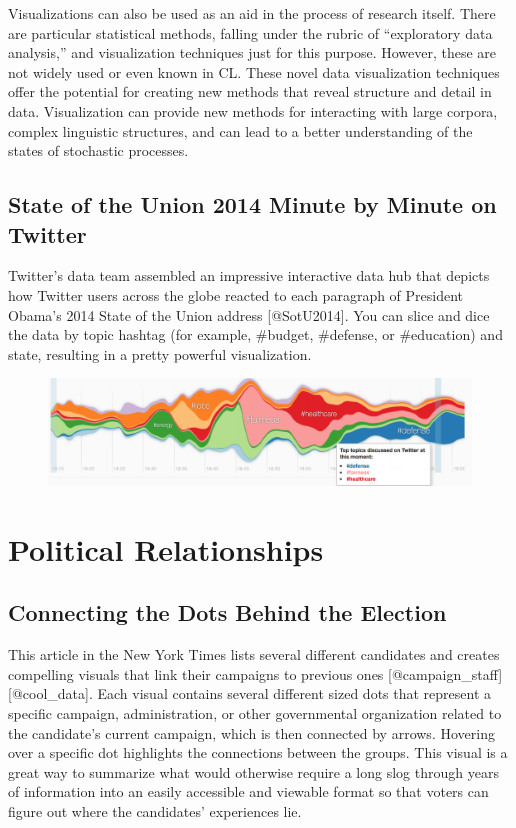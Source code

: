 \documentclass[]{book}
\theoremstyle{definition}
\theoremstyle{definition}
\theoremstyle{definition}
\theoremstyle{remark}
\begin{document}
Visualizations can also be used as an aid in the process of research
itself. There are particular statistical methods, falling under the
rubric of ``exploratory data analysis,'' and visualization techniques
just for this purpose. However, these are not widely used or even known
in CL. These novel data visualization techniques offer the potential for
creating new methods that reveal structure and detail in data.
Visualization can provide new methods for interacting with large
corpora, complex linguistic structures, and can lead to a better
understanding of the states of stochastic processes.

\subsection{State of the Union 2014 Minute by Minute on
Twitter}\label{state-of-the-union-2014-minute-by-minute-on-twitter}

Twitter's data team assembled an impressive interactive data hub that
depicts how Twitter users across the globe reacted to each paragraph of
President Obama's 2014 State of the Union address {[}@SotU2014{]}. You
can slice and dice the data by topic hashtag (for example, \#budget,
\#defense, or \#education) and state, resulting in a pretty powerful
visualization.

\begin{figure}
\centering
\includegraphics{images/SotU2014.png}
\caption{}
\end{figure}

\section{Political Relationships}\label{political-relationships}

\subsection{Connecting the Dots Behind the
Election}\label{connecting-the-dots-behind-the-election}

This article in the New York Times lists several different candidates
and creates compelling visuals that link their campaigns to previous
ones {[}@campaign\_staff{]}{[}@cool\_data{]}. Each visual contains
several different sized dots that represent a specific campaign,
administration, or other governmental organization related to the
candidate's current campaign, which is then connected by arrows.
Hovering over a specific dot highlights the connections between the
groups. This visual is a great way to summarize what would otherwise
require a long slog through years of information into an easily
accessible and viewable format so that voters can figure out where the
candidates' experiences lie.
\end{document}
